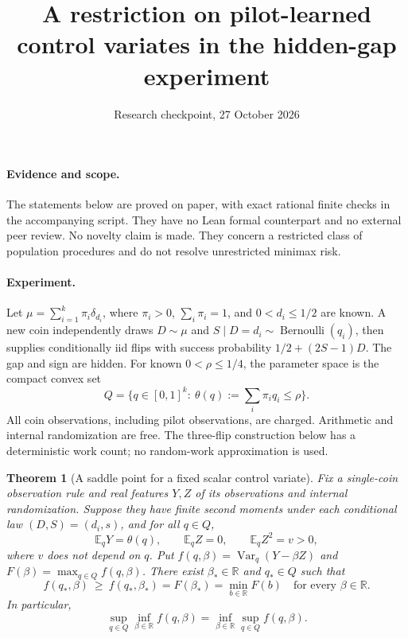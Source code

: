 \documentclass[11pt]{article}
\title{A restriction on pilot-learned control variates in the hidden-gap experiment}
\author{Research checkpoint, 27 October 2026}
\date{}
\newtheorem{theorem}{Theorem}
\newcommand{\E}{\mathbb E}
\newcommand{\Var}{\operatorname{Var}}
\begin{document}
\maketitle

\paragraph{Evidence and scope.}
The statements below are proved on paper, with exact rational finite checks
in the accompanying script. They have no Lean formal counterpart and no
external peer review. No novelty claim is made. They concern a restricted
class of population procedures and do not resolve unrestricted minimax risk.

\paragraph{Experiment.}
Let $\mu=\sum_{i=1}^k\pi_i\delta_{d_i}$, where $\pi_i>0$,
$\sum_i\pi_i=1$, and $0<d_i\le1/2$ are known. A new coin independently draws
$D\sim\mu$ and $S\mid D=d_i\sim\operatorname{Bernoulli}(q_i)$, then supplies
conditionally iid flips with success probability $1/2+(2S-1)D$.
The gap and sign are hidden. For known $0<\rho\le1/4$, the parameter space is
the compact convex set
\[
 Q=\{q\in[0,1]^k:\ \theta(q):=\textstyle\sum_i\pi_iq_i\le\rho\}.
\]
All coin observations, including pilot observations, are charged. Arithmetic
and internal randomization are free. The three-flip construction below has a
deterministic work count; no random-work approximation is used.

\begin{theorem}[A saddle point for a fixed scalar control variate]\label{thm:saddle}
Fix a single-coin observation rule and real features $Y,Z$ of its observations
and internal randomization. Suppose they have finite second moments under
each conditional law $(D,S)=(d_i,s)$, and for all $q\in Q$,
\[
 \E_qY=\theta(q),\qquad \E_qZ=0,\qquad \E_qZ^2=v>0,
\]
where $v$ does not depend on $q$. Put
$f(q,\beta)=\Var_q(Y-\beta Z)$ and
$F(\beta)=\max_{q\in Q}f(q,\beta)$.
There exist $\beta_*\in\mathbb R$ and $q_*\in Q$ such that
\[
 f(q_*,\beta)\ \ge\ f(q_*,\beta_*)=F(\beta_*)=\min_{b\in\mathbb R}F(b)
 \quad\text{for every }\beta\in\mathbb R.
\]
In particular,
\[
 \sup_{q\in Q}\inf_{\beta\in\mathbb R} f(q,\beta)
 =\inf_{\beta\in\mathbb R}\sup_{q\in Q} f(q,\beta).
\]
\end{theorem}
\end{document}
